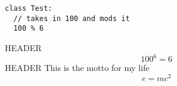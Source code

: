 \documentclass[12pt]{article}
\begin{document}
\vspace{0mm}
\begin{lstlisting}
class Test: 
  // takes in 100 and mods it
  100 % 6 
\end{lstlisting}
\vspace{2mm}
HEADER$$ 100^6 = 6 $$ HEADER
\vspace{2mm}
This is the motto for my life
\vspace{2mm}
$$ e = mc^2 $$ 
\end{document}
